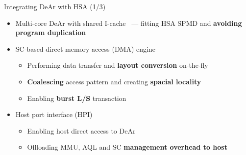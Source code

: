 \documentclass[handout]{beamer}
\begin{document}
\begin{CJK}{UTF8}{bkai}
            \begin{frame}{Integrating DeAr with HSA (1/3)}
                \begin{itemize}
                    \item <2-> {Multi-core DeAr with shared I-cache~ --- fitting HSA SPMD and \textbf{avoiding program duplication}}
                    \item <3-> {SC-based direct memory access (DMA) engine~
                            \begin{itemize}
                                \item Performing data transfer and \textbf{layout conversion} on-the-fly
                                \item \textbf{Coalescing} access pattern and creating \textbf{spacial locality}
                                \item Enabling \textbf{burst L/S} transaction
                            \end{itemize}
                        }
                    \item <4-> {Host port interface (HPI)~
                            \begin{itemize}
                                \item Enabling host direct access to DeAr
                                \item Offloading MMU, AQL and SC \textbf{management overhead to host}
                            \end{itemize}
                        }
                \end{itemize}
            \end{frame}


\end{CJK}
\end{document}
